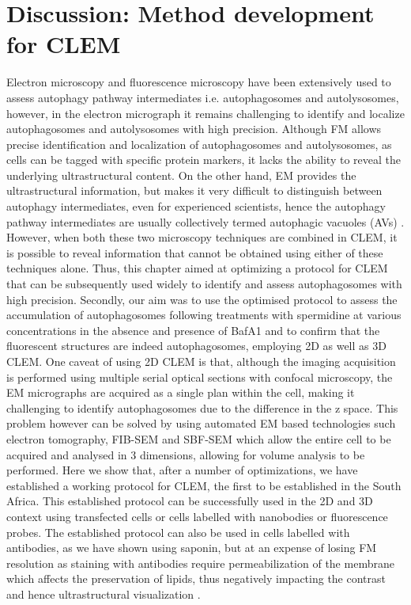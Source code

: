 \section{Discussion: Method development for CLEM}
Electron microscopy and fluorescence microscopy have been extensively used to assess autophagy pathway intermediates i.e. autophagosomes and autolysosomes, however, in the electron micrograph it remains challenging to identify and localize autophagosomes and autolysosomes with high precision. Although FM allows precise identification and localization of autophagosomes and autolysosomes, as cells can be tagged with specific protein markers, it lacks the ability to reveal the underlying ultrastructural content. On the other hand, EM provides the ultrastructural information, but makes it very difficult to distinguish between autophagy intermediates, even for experienced scientists, hence the autophagy pathway intermediates are usually collectively termed autophagic vacuoles (AVs) \citep{Eskelinen2008,klionsky2016}. However, when both these two microscopy techniques are combined in CLEM, it is possible to reveal information that cannot be obtained using either of these techniques alone. Thus, this chapter aimed at optimizing a protocol for CLEM that can be subsequently used widely to identify and assess autophagosomes with high precision. Secondly, our aim was to use the optimised protocol to assess the accumulation of autophagosomes following treatments with spermidine at various concentrations in the absence and presence of BafA1 and to confirm that the fluorescent structures are indeed autophagosomes, employing 2D as well as 3D CLEM. One caveat of using 2D CLEM is that, although the imaging acquisition is performed using multiple serial optical sections with confocal microscopy, the EM micrographs are acquired as a single plan within the cell, making it challenging to identify autophagosomes due to the difference in the z space. This problem however can be solved by using automated EM based technologies such electron tomography, FIB-SEM and SBF-SEM \citep{Burel2018,Duke2014,Russell2017,Yla-Anttila2009} which allow the entire cell to be acquired and analysed in 3 dimensions, allowing for volume analysis to be performed. Here we show that, after a number of optimizations, we have established a working protocol for CLEM, the first to be established in the South Africa. This established protocol can be successfully used in the 2D and 3D context using transfected cells or cells labelled with nanobodies or fluorescence probes. The established protocol can also be used in cells labelled with antibodies, as we have shown using saponin, but at an expense of losing FM resolution as staining with antibodies require permeabilization of the membrane which affects the preservation of lipids, thus negatively impacting the contrast and hence ultrastructural visualization \citep{Eskelinen2008}.

